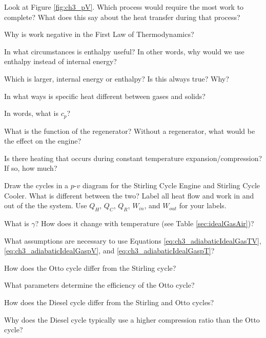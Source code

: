 \begin{homework}
  \question Look at Figure \ref{fig:ch3_pV}.  Which process would require the most work to complete?  What does this say about the heat transfer during that process?
  
  \question Why is work negative in the First Law of Thermodynamics?

  \question In what circumstances is enthalpy useful?  In other words, why would we use enthalpy instead of internal energy?
  
  \question Which is larger, internal energy or enthalpy?  Is this always true?  Why?

  \question In what ways is specific heat different between gases and solids?
  
  \question In words, what is $c_p$?

  \question What is the function of the regenerator?  Without a regenerator, what would be the effect on the engine?
  
  \question Is there heating that occurs during constant temperature expansion/compression?  If so, how much?
  
  \question Draw the cycles in a $p$-$v$ diagram for the Stirling Cycle Engine and Stirling Cycle Cooler.  What is different between the two? Label all heat flow and work in and out of the the system.  Use $Q_H$, $Q_C$, $Q_R$, $W_{in}$, and $W_{out}$ for your labels.

  \question What is $\gamma$?  How does it change with temperature (see Table \ref{sec:idealGasAir})?
  
  \question What assumptions are necessary to use Equations \ref{eq:ch3_adiabaticIdealGasTV}, \ref {eq:ch3_adiabaticIdealGaspV}, and \ref{eq:ch3_adiabaticIdealGaspT}?
  
  \question How does the Otto cycle differ from the Stirling cycle?
  
  \question What parameters determine the efficiency of the Otto cycle?
  
  \question How does the Diesel cycle differ from the Stirling and Otto cycles?
  
  \question Why does the Diesel cycle typically use a higher compression ratio than the Otto cycle?



\end{homework}
